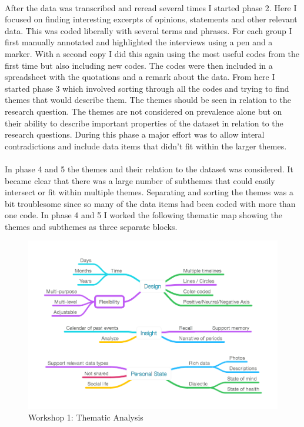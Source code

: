 \documentclass[11pt,UKenglish, a4paper]{article}
\begin{document}
\paragraph{}After the data was transcribed and reread several times I started phase 2. Here I focused on finding interesting excerpts of opinions, statements and other relevant data. This was coded liberally with several terms and phrases. For each group I first manually annotated and highlighted the interviews using a pen and a marker. With a second copy I did this again using the most useful codes from the first time but also including new codes. The codes were then included in a spreadsheet with the quotations and a remark about the data. 
From here I started phase 3 which involved sorting through all the codes and trying to find themes that would describe them. The themes should be seen in relation to the research question. The themes are not considered on prevalence alone but on their ability to describe important properties of the dataset in relation to the research questions\cite[]{Braun2006Using}. During this phase a major effort was to allow interal contradictions and include data items that didn't fit within the larger themes. 

\paragraph*{}In phase 4 and 5 the themes and their relation to the dataset was considered. It became clear that there was a large number of subthemes that could easily intersect or fit within multiple themes. Separating and sorting the themes was a bit troublesome since so many of the data items had been coded with more than one code. In phase 4 and 5 I worked the following thematic map showing the themes and subthemes as three separate blocks. 
\begin{figure}[Thematic Map]
    \centering
	\includegraphics[width=1\linewidth]{Images/ThematicAnalysis}
    \caption{Workshop 1: Thematic Analysis}
    \label{fig:1}
\end{figure}
\end{document}
